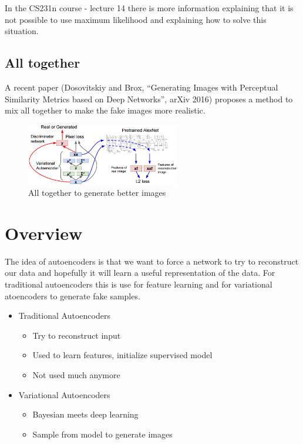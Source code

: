 In the CS231n course - lecture 14 there is more information explaining that it is not possible to use maximum likelihood and explaining how to solve this situation.

\subsection*{All together}
A recent paper (Dosovitskiy and Brox, “Generating Images with Perceptual Similarity Metrics based on Deep Networks”, arXiv 2016) proposes a method to mix all together to make the fake images more realistic.
\begin{figure}[!htb]
  \centering
  \includegraphics[width=0.6\textwidth]{Images/autoencoders/11.png}
  \caption{All together to generate better images}
\end{figure}

\section{Overview}
The idea of autoencoders is that we want to force a network to try to reconstruct our data and hopefully it will learn a useful representation of the data. For traditional autoencoders this is use for feature learning and for variational atoencoders to generate fake samples.

\begin{itemize}
\item Traditional Autoencoders
\begin{itemize}
\item Try to reconstruct input
\item Used to learn features, initialize supervised model
\item Not used much anymore
\end{itemize}
\item Variational Autoencoders
\begin{itemize}
\item Bayesian meets deep learning
\item Sample from model to generate images
\end{itemize}
\end{itemize}
